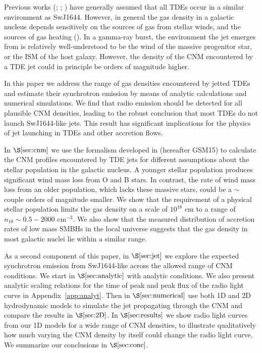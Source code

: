 \documentclass[usenatbib,fleqn]{mnras}
\begin{document}
Previous works (\citealt{Bower+2013}; \citealt{van-Velzen+2013};
\citealt{Mimica+2015}) have generally assumed that all TDEs occur in a
similar environment as SwJ1644.  However, in general the
gas density in a galactic nucleus depends sensitively on the sources
of gas from stellar winds, and the sources of gas heating
(\citealt{Quataert2004,Generozov+2015}).  In a gamma-ray burst, the
environment the jet emerges from is relatively well-understood to be
the wind of the massive progenitor star, or the ISM of the host
galaxy.  However, the density of the CNM encountered by a TDE jet
could in principle be orders of magnitude higher.

In this paper we address the range of gas densities encountered by
jetted TDEs and estimate their synchrotron emission by means of
analytic calculations and numerical simulations.  We find that radio
emission should be detected for all plausible CNM densities, leading to the robust conclusion that most TDEs do not launch SwJ1644-like
jets.  This result has significant implications for the physics
of jet launching in TDEs and other accretion flows. 

In $\S\ref{sec:cnm}$ we use the formalism developed in
\citet{Generozov+2015} (hereafter GSM15) to calculate the CNM profiles
encountered by TDE jets for different assumptions about the stellar
population in the galactic nucleus.  A younger stellar population
produces significant wind mass loss from O and B stars. In contrast,
the rate of wind mass loss from an older population, which lacks these
massive stars, could be a $\sim$couple orders of magnitude smaller.
We show that the requirement of a physical stellar population limits
the gas density on a scale of $10^{18}$ cm to a range of $n_{18} \sim
0.5-2000$ cm$^{-3}$. We also show that the measured distribution of
accretion rates of low mass SMBHs in the local universe suggests that
the gas density in most galactic nuclei lie within a similar range.

As a second component of this paper, in $\S\ref{sec:jet}$ we explore
the expected synchrotron emission from SwJ1644-like
across the allowed range of CNM conditions.  We start in
$\S\ref{sec:analytic}$ with analytic conditions. We also present
analytic scaling relations for the time of peak and peak flux of the
radio light curve in Appendix~\ref{app:analyt}.  Then in
$\S\ref{sec:numerical}$ use both 1D and 2D hydrodynamic models to
simulate the jet propagating through the CNM and compare the results
in $\S\ref{sec:2D}$. In $\S\ref{sec:results}$ we show radio light
curves from our 1D models for a wide range of CNM densities, to
illustrate qualitatively how much varying the CNM density by itself
could change the radio light curve.  We summarize our conclusions in
$\S\ref{sec:conc}$.
\end{document}
